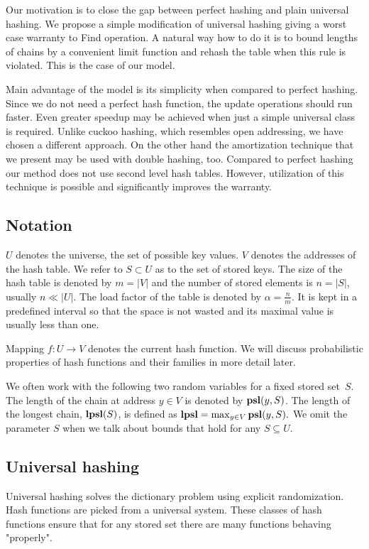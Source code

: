 Our motivation is to close the gap between perfect hashing and plain universal hashing. We propose a simple modification of universal hashing giving a worst case warranty to Find operation. A natural way how to do it is to bound lengths of chains by a convenient limit function and rehash the table when this rule is violated. This is the case of our model.

Main advantage of the model is its simplicity when compared to perfect hashing. Since we do not need a perfect hash function, the update operations should run faster. Even greater speedup may be achieved when just a simple universal class is required. Unlike cuckoo hashing, which resembles open addressing, we have chosen a different approach. On the other hand the amortization technique that we present may be used with double hashing, too. Compared to perfect hashing our method does not use second level hash tables. However, utilization of this technique is possible and significantly improves the warranty.

\subsection{Notation}
$U$ denotes the universe, the set of possible key values. $V$ denotes the addresses of the hash table. We refer to $S \subset U$ as to the set of stored keys. The size of the hash table is denoted by $m = |V|$ and the number of stored elements is $n = |S|$, usually $n \ll |U|$. The load factor of the table is denoted by $\alpha = \frac{n}{m}$. It is kept in a predefined interval so that the space is not wasted and its maximal value is usually less than one.

Mapping $f\colon U \rightarrow V$ denotes the current hash function. We will discuss probabilistic properties of hash functions and their families in more detail later.

We often work with the following two random variables for a fixed stored set~$S$. The length of the chain at address $y \in V$ is denoted by $\mathbf{psl}(y, S)$. The length of the longest chain, $\mathbf{lpsl}(S)$, is defined as $\mathbf{lpsl} = \max_{y \in V} \mathbf{psl}(y, S).$ We omit the parameter $S$ when we talk about bounds that hold for any $S \subseteq U$.

\subsection{Universal hashing}
Universal hashing solves the dictionary problem using explicit randomization. Hash functions are picked from a universal system. These classes of hash functions ensure that for any stored set there are many functions  behaving "properly".

